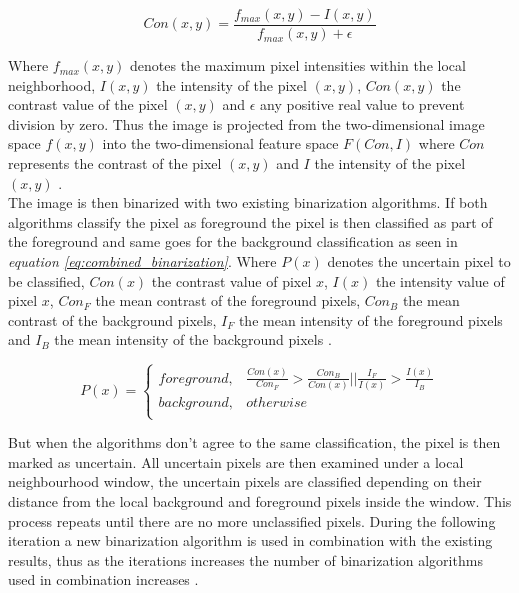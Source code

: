 \documentclass[11pt]{article}
\begin{document}
					\begin{large}
					\begin{equation} \label{eq:feat_extract}
						Con(x, y) = \frac{f_{max}(x, y) - I(x, y)}{f_{max}(x, y) + \epsilon}
					\end{equation}
					\end{large}

					Where $f_{max}(x, y)$ denotes the maximum pixel intensities within the local neighborhood, $I(x, y)$ the intensity of the pixel $(x, y)$, $Con(x, y)$ the contrast value of the pixel $(x, y)$ and $\epsilon$ any positive real value to prevent division by zero. Thus the image is projected from the two-dimensional image space $f(x, y)$ into the two-dimensional feature space $F(Con, I)$ where $Con$ represents the contrast of the pixel $(x, y)$ and $I$ the intensity of the pixel $(x, y)$ \cite{su2011combination}.\\

					The image is then binarized with two existing binarization algorithms. If both algorithms classify the pixel as foreground the pixel is then classified as part of the foreground and same goes for the background classification as seen in \textit{equation \ref{eq:combined_binarization}}. Where $P(x)$ denotes the uncertain pixel to be classified, $Con(x)$ the contrast value of pixel $x$, $I(x)$ the intensity value of pixel $x$, $Con_F$ the mean contrast of the foreground pixels, $Con_B$ the mean contrast of the background pixels, $I_F$ the mean intensity of the foreground pixels and $I_B$ the mean intensity of the background pixels \cite{su2011combination}.

					\begin{Large}
					\begin{equation} \label{eq:combined_binarization}
					 P(x) =
					 \begin{cases}
						foreground,          & \frac{Con(x)}{Con_F} > \frac{Con_B}{Con(x)} || \frac{I_F}{I(x)} > \frac{I(x)}{I_B}     \\
						background, & otherwise \\
					 \end{cases}
					\end{equation}
					\end{Large}

					But when the algorithms don't agree to the same classification, the pixel is then marked as uncertain. All uncertain pixels are then examined under a local neighbourhood window, the uncertain pixels are classified depending on their distance from the local background and foreground pixels inside the window. This process repeats until there are no more unclassified pixels. During the following iteration a new binarization algorithm is used in combination with the existing results, thus as the iterations increases the number of binarization algorithms used in combination increases \cite{su2011combination}.\\
\end{document}
